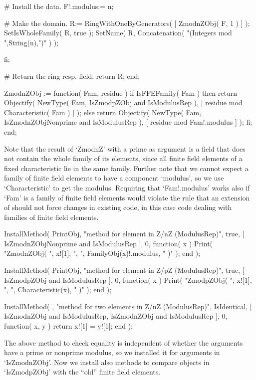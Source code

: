           # Install the data.
          F!.modulus:= n;
  
          # Make the domain.
          R:= RingWithOneByGenerators( [ ZmodnZObj( F, 1 ) ] );
          SetIsWholeFamily( R, true );
          SetName( R, Concatenation( "(Integers mod ",String(n),")" ) );

        fi;

        # Return the ring resp. field.
        return R;
    end;


    ZmodnZObj := function( Fam, residue )
    if IsFFEFamily( Fam ) then
      return Objectify( NewType( Fam,     IsZmodpZObj
                                      and IsModulusRep ),
                        [ residue mod Characteristic( Fam ) ] );
    else
      return Objectify( NewType( Fam,     IsZmodnZObjNonprime
                                      and IsModulusRep ),
                        [ residue mod Fam!.modulus ] );
    fi;
    end;
\endtt

Note that the result of `ZmodnZ' with a prime as argument is a field that
does not contain the whole family of its elements, since all finite field
elements of a fixed characteristic lie in the same family.
Further note that we cannot expect a family of finite field elements
to have a component `modulus',
so we use `Characteristic' to get the modulus.
Requiring that `Fam!.modulus' works also if `Fam' is a family of
finite field elements would violate the rule
that an extension of {\GAP} should not force changes in existing code,
in this case code dealing with families of finite field elements.

\begintt
    InstallMethod( PrintObj,
        "method for element in Z/nZ (ModulusRep)",
        true,
        [ IsZmodnZObjNonprime and IsModulusRep ], 0,
        function( x )
        Print( "ZmodnZObj( ", x![1], ", ", FamilyObj(x)!.modulus, " )" );
        end );

    InstallMethod( PrintObj,
        "method for element in Z/pZ (ModulusRep)",
        true,
        [ IsZmodpZObj and IsModulusRep ], 0,
        function( x )
        Print( "ZmodpZObj( ", x![1], ", ", Characteristic(x), " )" );
        end );

    InstallMethod( \=,
        "method for two elements in Z/nZ (ModulusRep)",
        IsIdentical,
        [ IsZmodnZObj and IsModulusRep,
          IsZmodnZObj and IsModulusRep ], 0,
        function( x, y ) return x![1] = y![1]; end );
\endtt

The above method to check equality is independent of whether the
arguments have a prime or nonprime modulus,
so we installed it for arguments in `IsZmodnZObj'.
Now we install also methods to compare objects in `IsZmodpZObj'
with the ``old'' finite field elements.

